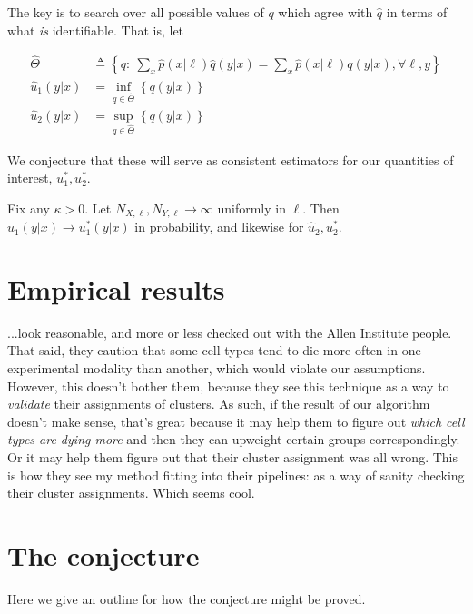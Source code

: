 The key is to search over all possible values of $q$ which agree with $\hat q$ in terms of what \emph{is} identifiable. That is, let 

\begin{align*}
\hat\Theta &\triangleq\left\{q:\ \sum_x \hat p(x|\ell)\hat q(y|x) =\sum_x \hat p(x|\ell)q(y|x), \forall \ell,y\right\}\\ 
\hat u_1(y|x) &= \inf_{q\in\hat\Theta} \left\{q(y|x) \right\} \\
\hat u_2(y|x) &= \sup_{q\in\hat\Theta} \left\{q(y|x) \right\}
\end{align*}

We conjecture that these will serve as consistent estimators for our quantities of interest, $u_1^*,u_2^*$.\vspace{.1in}

\vspace{.1in}
\begin{conj}
Fix any $\kappa>0$.  Let $N_{X,\ell},N_{Y,\ell}\rightarrow\infty$ uniformly in $\ell$.  Then $\hat u_1(y|x)\rightarrow u^*_1(y|x)$ in probability, and likewise for $\hat u_2,u^*_2$.
\end{conj}

\section{Empirical results}

...look reasonable, and more or less checked out with the Allen Institute people.  That said, they caution that some cell types tend to die more often in one experimental modality than another, which would violate our assumptions.  However, this doesn't bother them, because they see this technique as a way to \emph{validate} their assignments of clusters.  As such, if the result of our algorithm doesn't make sense, that's great because it may help them to figure out \emph{which cell types are dying more} and then they can upweight certain groups correspondingly.  Or it may help them figure out that their cluster assignment was all wrong.  This is how they see my method fitting into their pipelines: as a way of sanity checking their cluster assignments.  Which seems cool.

\section{The conjecture}

Here we give an outline for how the conjecture might be proved.

